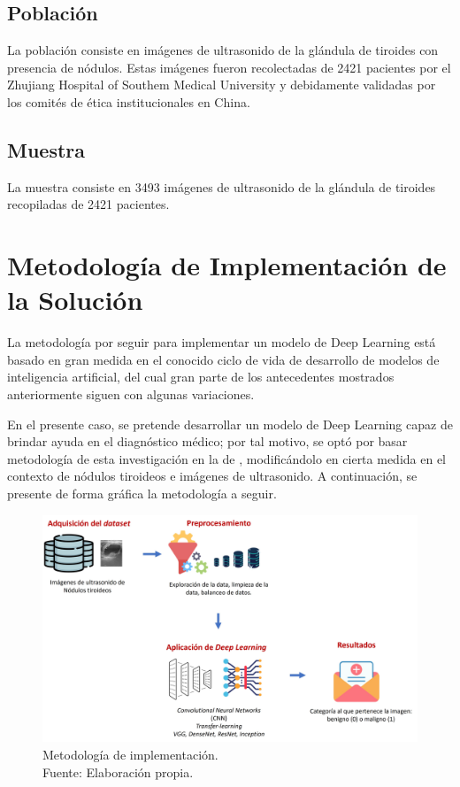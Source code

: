 \subsection{Población}
La población consiste en imágenes de ultrasonido de la glándula de tiroides con presencia de nódulos. Estas imágenes fueron recolectadas de 2421 pacientes por el Zhujiang Hospital of Southem Medical University y debidamente validadas por los comités de ética institucionales en China.

\subsection{Muestra}
La muestra consiste en 3493 imágenes de ultrasonido de la glándula de tiroides recopiladas de 2421 pacientes.

\section{Metodología de Implementación de la Solución}
La metodología por seguir para implementar un modelo de Deep Learning está basado en gran medida en el conocido ciclo de vida de desarrollo de modelos de inteligencia artificial, del cual gran parte de los antecedentes mostrados anteriormente siguen con algunas variaciones. 

En el presente caso, se pretende desarrollar un modelo de Deep Learning capaz de brindar ayuda en el diagnóstico médico; por tal motivo, se optó por basar metodología de esta investigación en la de \cite{pr_monroy2021disvc}, modificándolo en cierta medida en el contexto de nódulos tiroideos e imágenes de ultrasonido. A continuación, se presente de forma gráfica la metodología a seguir.

\begin{figure}[H]
	\begin{center}
		\includegraphics[width=1.00\textwidth]{3/figures/metod_classthy1.jpg}
		\caption[Metodología de implementación]{Metodología de implementación. \\
		Fuente: Elaboración propia.}
		\label{3:fig301}
	\end{center}
\end{figure}

